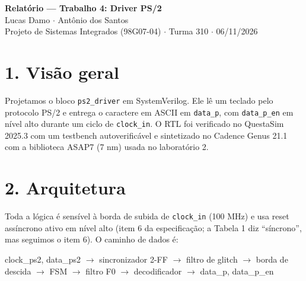 \documentclass[a4paper,11pt]{article}
\begin{document}
\begin{center}
    {\large\bfseries Relatório --- Trabalho 4: Driver PS/2}\\[4pt]
    Lucas Damo $\cdot$ Antônio dos Santos\\[4pt]
    Projeto de Sistemas Integrados (98G07-04) $\cdot$ Turma 310 $\cdot$ 06/11/2026
\end{center}

\section*{1. Visão geral}

Projetamos o bloco \texttt{ps2\_driver} em SystemVerilog. Ele lê um teclado pelo protocolo PS/2 e entrega o caractere em ASCII em \texttt{data\_p}, com \texttt{data\_p\_en} em nível alto durante um ciclo de \texttt{clock\_in}. O RTL foi verificado no QuestaSim 2025.3 com um testbench autoverificável e sintetizado no Cadence Genus 21.1 com a biblioteca ASAP7 (7 nm) usada no laboratório 2.

\section*{2. Arquitetura}

Toda a lógica é sensível à borda de subida de \texttt{clock\_in} (100 MHz) e usa reset assíncrono ativo em nível alto (item 6 da especificação; a Tabela 1 diz ``síncrono'', mas seguimos o item 6). O caminho de dados é:

\begin{center}
\small clock\_ps2, data\_ps2 $\rightarrow$ sincronizador 2-FF $\rightarrow$ filtro de glitch $\rightarrow$ borda de descida $\rightarrow$ FSM $\rightarrow$ filtro F0 $\rightarrow$ decodificador $\rightarrow$ data\_p, data\_p\_en
\end{center}
\end{document}

